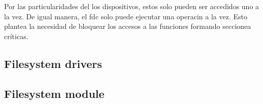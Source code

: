 \documentclass[a4paper]{article}
\begin{document}
Por las particularidades del los dispositivos, estos solo pueden ser accedidos uno a la vez. De igual manera, el fdc solo puede ejecutar una operacin a la vez. Esto plantea la necesidad de bloquear los accesos a las funciones formando seccionea críticas. 

\subsection{Filesystem drivers}

\subsection{Filesystem module}
\end{document}
